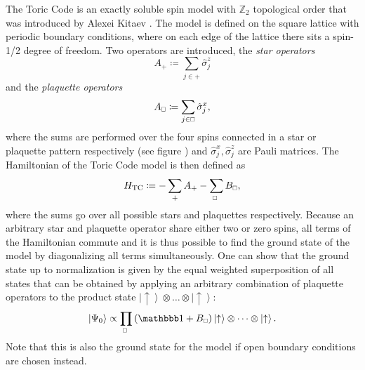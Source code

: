 The Toric Code is an exactly soluble spin model with $\mathbb{Z}_2$ topological order that was introduced by Alexei Kitaev \cite{cite:fault_tolerant_quantum_computation_by_anyons}. The model is defined on the square lattice with periodic boundary conditions, where on each edge of the lattice there sits a spin-1/2 degree of freedom. Two operators are introduced, the \textit{star operators}
\begin{equation}
	\label{eq:star_operator}
	A_+ \coloneqq \sum_{j\in+}\hat{\sigma}_j^z
\end{equation}
and the \textit{plaquette operators}
\begin{equation}
	\label{eq:plaquette_operator}
	A_{\scalebox{0.6}{$\square$}} \coloneqq \sum_{j\in \scalebox{0.6}{$\square$}} \hat{\sigma}_j^x,
\end{equation}
where the sums are performed over the four spins connected in a star or plaquette pattern respectively (see figure ) and $\hat{\sigma}_j^x, \hat{\sigma}_j^z$ are Pauli matrices. The Hamiltonian of the Toric Code model is then defined as
\begin{equation}
	\label{eq:toric_code_hamiltonian}
	H_\text{TC} \coloneqq -\sum_+A_+ - \sum_{\scalebox{0.6}{$\square$}}B_{\scalebox{0.6}{$\square$}},
\end{equation}
where the sums go over all possible stars and plaquettes respectively. Because an arbitrary star and plaquette operator share either two or zero spins, all terms of the Hamiltonian commute and it is thus possible to find the ground state of the model by diagonalizing all terms simultaneously. One can show that the ground state up to normalization is given by the equal weighted superposition of all states that can be obtained by applying an arbitrary combination of plaquette operators to the product state $\left|\uparrow\right\rangle \otimes \dots \otimes \left|\uparrow\right\rangle$:
\begin{equation}
	\left|\Psi_0\right\rangle \propto \prod_{\scalebox{0.6}{$\square$}}\left(\id + B_{\scalebox{0.6}{$\square$}}\right) \left|\uparrow\right\rangle \otimes \dots \otimes \left|\uparrow\right\rangle.
\end{equation}
Note that this is also the ground state for the model if open boundary conditions are chosen instead. \par
